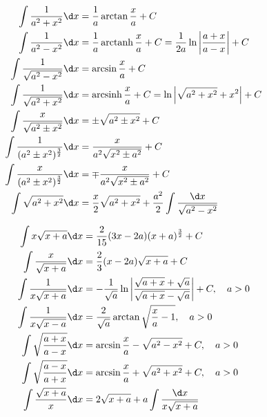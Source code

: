 \begin{example}[带 $a^2 \pm x^2$]
	\[ \begin{aligned}
			\int \frac{1}{a^2+x^2} \d x                     & = \frac{1}{a} \arctan \frac{x}{a} + C                                                        \\
			\int \frac{1}{a^2 - x^2} \d x                   & = \frac{1}{a} \arctanh \frac{x}{a} + C  = \frac{1}{2a} \ln \left| \frac{a+x}{a-x}\right| + C \\
			\int \frac{1}{\sqrt{a^2 - x^2}} \d x            & = \arcsin \frac{x}{a} + C                                                                    \\
			\int \frac{1}{\sqrt{a^2 + x^2}} \d x            & = \arcsinh \frac{x}{a} + C  = \ln \left| \sqrt{a^2 + x^2} + x^2 \right|  + C                 \\
			\int \frac{x}{\sqrt{a^2 \pm x^2}} \d x          & = \pm\sqrt{a^2 \pm x^2} + C                                                                  \\
			\int \frac{1}{(a^2 \pm x^2)^{\frac{3}{2}}} \d x & = \frac{x}{a^2\sqrt{x^2 \pm a^2}} + C                                                        \\
			\int \frac{x}{(a^2 \pm x^2)^{\frac{3}{2}}} \d x & = \mp \frac{x}{a^2\sqrt{x^2 \pm a^2}} + C                                                    \\
			\int \sqrt{a^2 + x^2} \d x                      & = \frac{x}{2}  \sqrt{a^2+x^2}+\frac{a^2}{2} \int \frac{\d x}{\sqrt{a^2-x^2}}
		\end{aligned} \]
\end{example}

\begin{example}[根式]
	\[ \begin{aligned}
			\int x \sqrt{x+a} \d x           & = \frac{2}{15} (3x - 2a) (x+a)^{\frac{3}{2}} + C                                                                   \\
			\int \frac{x}{\sqrt{x+a}} \d x   & = \frac{2}{3} (x - 2a) \sqrt{x+a} + C                                                                              \\
			\int \frac{1}{x\sqrt{x+a}} \d x  & = -\frac{1}{\sqrt{a}} \ln \left| \frac{\sqrt{a + x} + \sqrt{a}}{\sqrt{a + x} - \sqrt{a}} \right| + C , \quad a > 0 \\
			\int \frac{1}{x\sqrt{x-a}} \d x  & = \frac{2}{\sqrt{a}}\arctan \sqrt{\frac{x}{a}-1}, \quad a > 0                                                      \\
			\int \sqrt{\frac{a+x}{a-x}} \d x & = \arcsin \frac{x}{a} - \sqrt{a^2 - x^2} + C, \quad a > 0                                                          \\
			\int \sqrt{\frac{a-x}{a+x}} \d x & = \arcsin \frac{x}{a} + \sqrt{a^2 + x^2} + C, \quad a > 0                                                          \\
			\int \frac{\sqrt{x+a}}{x} \d x   & = 2 \sqrt{x+a} + a \int \frac{\d x}{x \sqrt{x+a}}
		\end{aligned} \]
\end{example}

